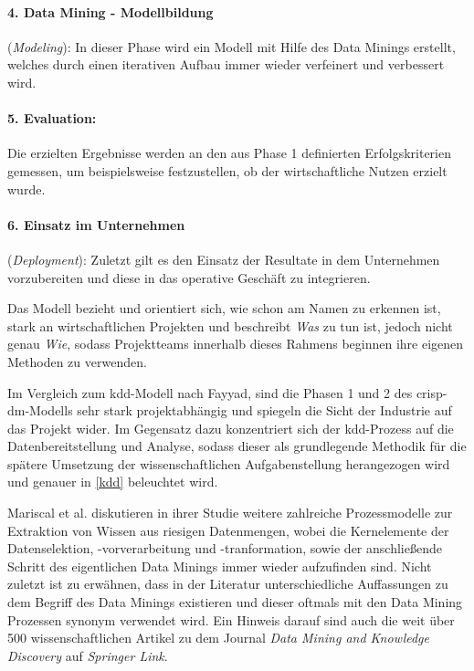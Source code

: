 \paragraph{4. Data Mining - Modellbildung}(\textit{Modeling}): 
In dieser Phase wird ein Modell mit Hilfe des Data Minings erstellt, welches durch einen iterativen Aufbau immer wieder verfeinert und verbessert wird. 
\paragraph{5. Evaluation:}
Die erzielten Ergebnisse werden an den aus Phase 1 definierten Erfolgskriterien gemessen, um beispielsweise festzustellen, ob der wirtschaftliche Nutzen erzielt wurde.
\paragraph{6. Einsatz im Unternehmen}(\textit{Deployment}): 
Zuletzt gilt es den Einsatz der Resultate in dem Unternehmen vorzubereiten und diese in das operative Geschäft zu integrieren.

Das Modell bezieht und orientiert sich, wie schon am Namen zu erkennen ist, stark an wirtschaftlichen Projekten und beschreibt \textit{Was} zu tun ist, jedoch nicht genau \textit{Wie}, sodass Projektteams innerhalb dieses Rahmens beginnen ihre eigenen Methoden zu verwenden.

Im Vergleich zum \gls{kdd}-Modell nach Fayyad, sind die Phasen 1 und 2 des \gls{crisp-dm}-Modells sehr stark projektabhängig und spiegeln die Sicht der Industrie auf das Projekt wider. Im Gegensatz dazu konzentriert sich der \gls{kdd}-Prozess auf die Datenbereitstellung und Analyse, sodass dieser als grundlegende Methodik für die spätere Umsetzung der wissenschaftlichen Aufgabenstellung herangezogen wird und genauer in \vref{kdd} beleuchtet wird.

Mariscal et al. diskutieren in ihrer Studie weitere zahlreiche Prozessmodelle zur Extraktion von Wissen aus riesigen Datenmengen, wobei die Kernelemente der Datenselektion, -vorverarbeitung und -tranformation, sowie der anschließende Schritt des eigentlichen Data Minings immer wieder aufzufinden sind. Nicht zuletzt ist zu erwähnen, dass in der Literatur unterschiedliche Auffassungen zu dem Begriff des Data Minings existieren und dieser oftmals mit den Data Mining Prozessen synonym verwendet wird. Ein Hinweis darauf sind auch die weit über 500 wissenschaftlichen Artikel zu dem Journal \textit{Data Mining and Knowledge Discovery} auf \textit{Springer Link}.

